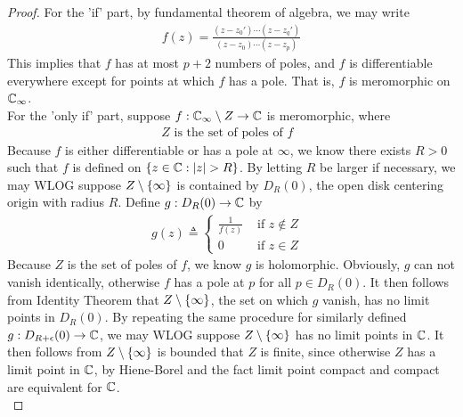 \documentclass{report}
\begin{document}
\begin{proof}

For the 'if' part, by fundamental theorem of algebra, we may write 
\begin{align*}
f(z)= \frac{(z-z_0')\cdots (z-z_q')}{(z-z_0)\cdots (z-z_p)}
\end{align*}
This implies that  $f$ has at most $p+2$ numbers of poles, and  $f$ is differentiable everywhere except for points at which $f$ has a pole. That is, $f$ is meromorphic on  $\mathbb{C}_{\infty}$.\\

For the 'only if' part, suppose $f:\mathbb{C}_{\infty} \setminus Z\rightarrow \mathbb{C}$ is meromorphic, where 
\begin{align*}
Z\text{ is the set of poles of $f$ }
\end{align*}
Because $f$ is either differentiable or has a pole at $\infty$, we know there exists $R>0$ such that  $f$ is defined on $\set{z\inc: \abso{z}>R}$. By letting $R$ be larger if necessary, we may WLOG suppose $Z\setminus \{ \infty \}$ is contained by $D_R(0)$, the open disk centering origin with radius $R$. Define $g:D_R(0)\rightarrow \mathbb{C}$ by 
\begin{align*}
g(z)\triangleq \begin{cases}
  \frac{1}{f(z)}& \text{ if $z\not\in Z$ }\\
  0& \text{ if $z\in Z$ }
\end{cases}
\end{align*}
Because $Z$ is the set of poles of  $f$, we know  $g$ is holomorphic. Obviously, $g$ can not vanish identically, otherwise $f$ has a pole at $p$ for all  $p \in D_R(0)$. It then follows from Identity Theorem that $Z\setminus \{ \infty \}$, the set on which $g$ vanish, has no limit points in $D_R(0)$. By repeating the same procedure for similarly defined $g:D_{R+\epsilon }(0)\rightarrow \mathbb{C}$, we may WLOG suppose $Z \setminus \{ \infty \}$ has no limit points in $\mathbb{C}$. It then follows from  $Z \setminus \{ \infty \}$ is bounded that $Z$ is finite, since otherwise  $Z$ has a limit point in  $\mathbb{C}$, by Hiene-Borel and the fact limit point compact and compact are equivalent for  $\mathbb{C}$. \\


\end{proof}
\end{document}
